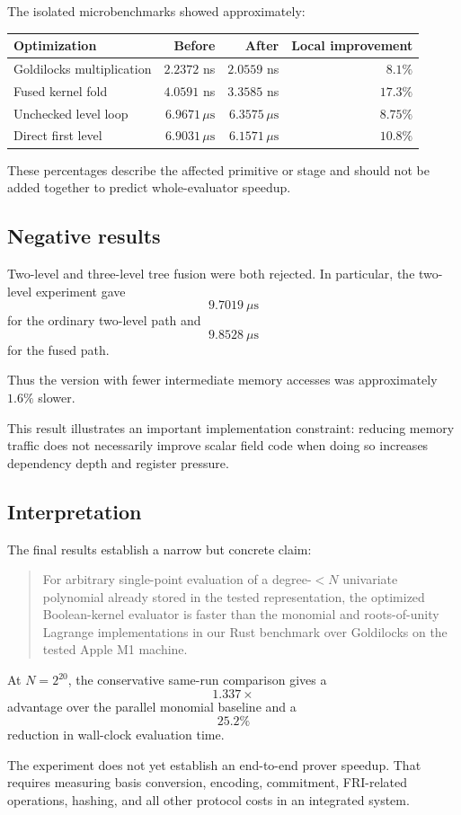 The isolated microbenchmarks showed approximately:

\begin{center}
\begin{tabular}{lrrr}
\toprule
Optimization &
Before &
After &
Local improvement \\
\midrule
Goldilocks multiplication &
\(2.2372\) ns &
\(2.0559\) ns &
\(8.1\%\) \\

Fused kernel fold &
\(4.0591\) ns &
\(3.3585\) ns &
\(17.3\%\) \\

Unchecked level loop &
\(6.9671\,\mu\mathrm{s}\) &
\(6.3575\,\mu\mathrm{s}\) &
\(8.75\%\) \\

Direct first level &
\(6.9031\,\mu\mathrm{s}\) &
\(6.1571\,\mu\mathrm{s}\) &
\(10.8\%\) \\
\bottomrule
\end{tabular}
\end{center}

These percentages describe the affected primitive or stage and should not be
added together to predict whole-evaluator speedup.

\subsection{Negative results}

Two-level and three-level tree fusion were both rejected.  In particular,
the two-level experiment gave
\[
9.7019\ \mu\mathrm{s}
\]
for the ordinary two-level path and
\[
9.8528\ \mu\mathrm{s}
\]
for the fused path.

Thus the version with fewer intermediate memory accesses was approximately
\(1.6\%\) slower.

This result illustrates an important implementation constraint: reducing
memory traffic does not necessarily improve scalar field code when doing so
increases dependency depth and register pressure.

\subsection{Interpretation}

The final results establish a narrow but concrete claim:

\begin{quote}
For arbitrary single-point evaluation of a degree-\(<N\) univariate
polynomial already stored in the tested representation, the optimized
Boolean-kernel evaluator is faster than the monomial and roots-of-unity
Lagrange implementations in our Rust benchmark over Goldilocks on the
tested Apple M1 machine.
\end{quote}

At \(N=2^{20}\), the conservative same-run comparison gives a
\[
1.337\times
\]
advantage over the parallel monomial baseline and a
\[
25.2\%
\]
reduction in wall-clock evaluation time.

The experiment does not yet establish an end-to-end prover speedup.  That
requires measuring basis conversion, encoding, commitment, FRI-related
operations, hashing, and all other protocol costs in an integrated system.
